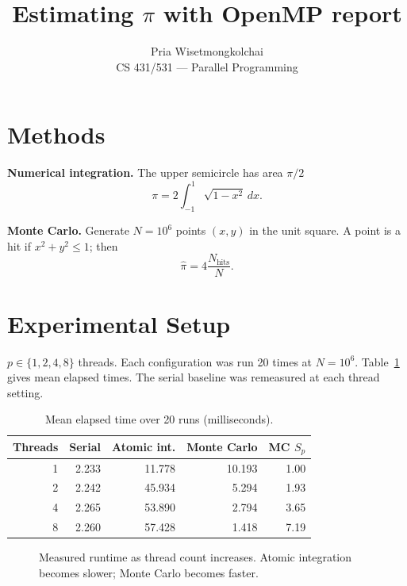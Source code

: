 \documentclass[11pt]{article}
\title{Estimating $\pi$ with OpenMP report}
\author{Pria Wisetmongkolchai\\CS 431/531 --- Parallel Programming}
\begin{document}
\maketitle
\section{Methods}
\textbf{Numerical integration.} The upper semicircle has area $\pi/2$
\begin{equation}
\pi = 2\int_{-1}^{1}\sqrt{1-x^2}\,dx.
\label{eq:integral}
\end{equation}


\textbf{Monte Carlo.} Generate $N=10^6$ points $(x,y)$ in the unit square. A point is a hit if $x^2+y^2\leq1$; then
\begin{equation}
\widehat\pi=4\frac{N_{\mathrm{hits}}}{N}.
\end{equation}
\section{Experimental Setup}
 $p\in\{1,2,4,8\}$ threads. Each configuration was run 20 times at $N=10^6$. Table~\ref{tab:results} gives mean elapsed times. The serial baseline was remeasured at each thread setting. 

\begin{table}[t]
\centering
\caption{Mean elapsed time over 20 runs (milliseconds).}
\label{tab:results}
\small
\begin{tabular}{@{}rrrrr@{}}
\toprule
Threads & Serial & Atomic int. & Monte Carlo & MC $S_p$ \\
\midrule
1 & 2.233 & 11.778 & 10.193 & 1.00 \\
2 & 2.242 & 45.934 & 5.294 & 1.93 \\
4 & 2.265 & 53.890 & 2.794 & 3.65 \\
8 & 2.260 & 57.428 & 1.418 & 7.19 \\
\bottomrule
\end{tabular}
\end{table}

\begin{figure}[t]
\centering
{}
\caption{Measured runtime as thread count increases. Atomic integration becomes slower; Monte Carlo becomes faster.}
\label{fig:time}
\end{figure}
\end{document}
